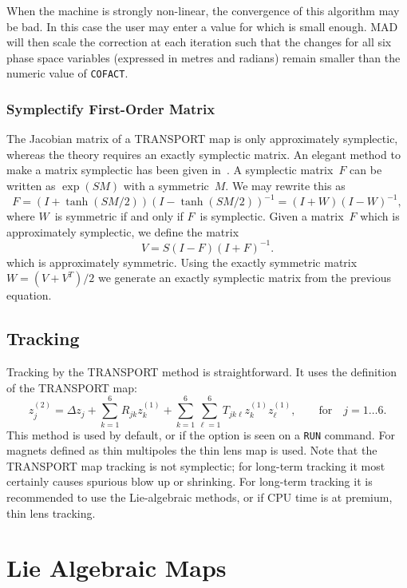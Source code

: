When the machine is strongly non-linear, the convergence of this
algorithm may be bad.
In this case the user may enter a value for  which is
small enough.
MAD will then scale the correction at each iteration such that the
changes for all six phase space variables (expressed in metres and
radians) remain smaller than the numeric value of {\tt COFACT}.

\subsection{Symplectify First-Order Matrix}
\label{symplectify}
The Jacobian matrix of a TRANSPORT map is only approximately symplectic,
whereas the theory requires an exactly symplectic matrix.
An elegant method to make a matrix symplectic has been given in~\cite{HEA86}.
A symplectic matrix~$F$ can be written as $\exp(SM)$ with a
symmetric~$M$.
We may rewrite this as
\[
F = (I + \tanh(SM/2))(I - \tanh(SM/2))^{-1} = (I + W)(I - W)^{-1},
\]
where $W$~is symmetric if and only if $F$~is symplectic.
Given a matrix~$F$ which is approximately symplectic,
we define the matrix
\[
V = S (I - F)(I + F)^{-1}.
\]
which is approximately symmetric.
Using the exactly symmetric matrix $W = (V + V^T) / 2$ we generate an
exactly symplectic matrix from the previous equation.

\section{Tracking}
Tracking by the TRANSPORT method is straightforward.
It uses the definition of the TRANSPORT map:
\[
z^{(2)}_j = \Delta z_j + \sum_{k=1}^6 R_{jk} z^{(1)}_k
          + \sum_{k=1}^6 \sum_{\ell=1}^6 T_{jk\ell} z^{(1)}_k z^{(1)}_\ell,
          \qquad \mathrm{for} \quad j = 1 \ldots 6.
\]
This method is used by default, or if the option
is seen on a {\tt RUN} command.
For magnets defined as thin multipoles the thin lens map is used.
Note that the TRANSPORT map tracking is not symplectic;
for long-term tracking it most certainly causes spurious blow up or
shrinking.
For long-term tracking it is recommended to use the Lie-algebraic
methods, or if CPU time is at premium, thin lens tracking.


\chapter{Lie Algebraic Maps}
\label{LIE}

